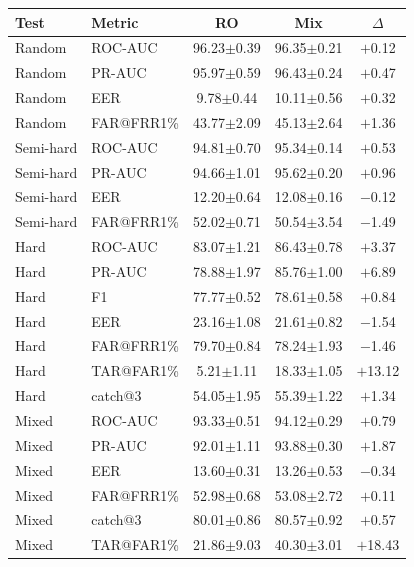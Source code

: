 \documentclass[11pt]{article}
\begin{document}
\begin{table}[!t]
\begin{minipage}[t]{0.48\textwidth}
\vspace{0.6em}
\begin{tabular}{l l c c c}
\toprule
\textbf{Test} & \textbf{Metric} & \textbf{RO} & \textbf{Mix} & \textbf{$\Delta$} \\
\midrule
Random    & ROC-AUC    & 96.23$\pm$0.39 & 96.35$\pm$0.21 & $+$0.12 \\
Random    & PR-AUC     & 95.97$\pm$0.59 & 96.43$\pm$0.24 & $+$0.47 \\
Random    & EER        & \phantom{0}9.78$\pm$0.44 & 10.11$\pm$0.56 & $+$0.32 \\
Random    & FAR@FRR1\% & 43.77$\pm$2.09 & 45.13$\pm$2.64 & $+$1.36 \\
\midrule
Semi-hard & ROC-AUC    & 94.81$\pm$0.70 & 95.34$\pm$0.14 & $+$0.53 \\
Semi-hard & PR-AUC     & 94.66$\pm$1.01 & 95.62$\pm$0.20 & $+$0.96 \\
Semi-hard & EER        & 12.20$\pm$0.64 & 12.08$\pm$0.16 & $-$0.12 \\
Semi-hard & FAR@FRR1\% & 52.02$\pm$0.71 & 50.54$\pm$3.54 & $-$1.49 \\
\midrule
Hard      & ROC-AUC    & 83.07$\pm$1.21 & 86.43$\pm$0.78 & $+$3.37 \\
Hard      & PR-AUC     & 78.88$\pm$1.97 & 85.76$\pm$1.00 & $+$6.89 \\
Hard      & F1         & 77.77$\pm$0.52 & 78.61$\pm$0.58 & $+$0.84 \\
Hard      & EER        & 23.16$\pm$1.08 & 21.61$\pm$0.82 & $-$1.54 \\
Hard      & FAR@FRR1\% & 79.70$\pm$0.84 & 78.24$\pm$1.93 & $-$1.46 \\
Hard      & TAR@FAR1\% & \phantom{0}5.21$\pm$1.11 & 18.33$\pm$1.05 & $+$13.12 \\
Hard      & catch@3    & 54.05$\pm$1.95 & 55.39$\pm$1.22 & $+$1.34 \\
\midrule
Mixed     & ROC-AUC    & 93.33$\pm$0.51 & 94.12$\pm$0.29 & $+$0.79 \\
Mixed     & PR-AUC     & 92.01$\pm$1.11 & 93.88$\pm$0.30 & $+$1.87 \\
Mixed     & EER        & 13.60$\pm$0.31 & 13.26$\pm$0.53 & $-$0.34 \\
Mixed     & FAR@FRR1\% & 52.98$\pm$0.68 & 53.08$\pm$2.72 & $+$0.11 \\
Mixed     & catch@3    & 80.01$\pm$0.86 & 80.57$\pm$0.92 & $+$0.57 \\
Mixed     & TAR@FAR1\% & 21.86$\pm$9.03 & 40.30$\pm$3.01 & $+$18.43 \\
\bottomrule
\end{tabular}
\label{tab:app_sbert_wc_bert}
\end{minipage}
\end{table}

\FloatBarrier
\end{document}
